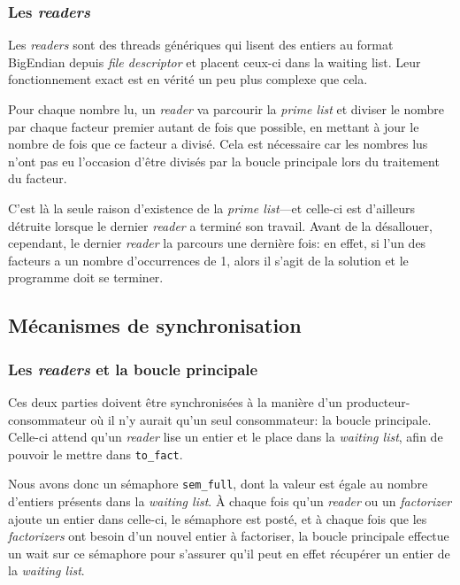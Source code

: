 \documentclass[a4paper,10pt]{article}
\begin{document}
\subsubsection*{Les \emph{readers}}

Les \emph{readers} sont des threads génériques qui lisent des entiers au format BigEndian depuis \emph{file descriptor} et placent ceux-ci dans la waiting list. Leur fonctionnement exact est en vérité un peu plus complexe que cela.

Pour chaque nombre lu, un \emph{reader} va parcourir la \emph{prime list} et diviser le nombre par chaque facteur premier autant de fois que possible, en mettant à jour le nombre de fois que ce facteur a divisé. Cela est nécessaire car les nombres lus n'ont pas eu l'occasion d'être divisés par la boucle principale lors du traitement du facteur.

C'est là la seule raison d'existence de la \emph{prime list}---et celle-ci est d'ailleurs détruite lorsque le dernier \emph{reader} a terminé son travail. Avant de la désallouer, cependant, le dernier \emph{reader} la parcours une dernière fois: en effet, si l'un des facteurs a un nombre d'occurrences de 1, alors il s'agit de la solution et le programme doit se terminer.

\subsection*{Mécanismes de synchronisation}

\subsubsection*{Les \emph{readers} et la boucle principale}

Ces deux parties doivent être synchronisées à la manière d'un producteur-consommateur où il n'y aurait qu'un seul consommateur: la boucle principale. Celle-ci attend qu'un \emph{reader} lise un entier et le place dans la \emph{waiting list}, afin de pouvoir le mettre dans \texttt{to\_fact}.

Nous avons donc un sémaphore \texttt{sem\_full}, dont la valeur est égale au nombre d'entiers présents dans la \emph{waiting list}. À chaque fois qu'un \emph{reader} ou un \emph{factorizer} ajoute un entier dans celle-ci, le sémaphore est posté, et à chaque fois que les \emph{factorizers} ont besoin d'un nouvel entier à factoriser, la boucle principale effectue un wait sur ce sémaphore pour s'assurer qu'il peut en effet récupérer un entier de la \emph{waiting list}.
\end{document}
